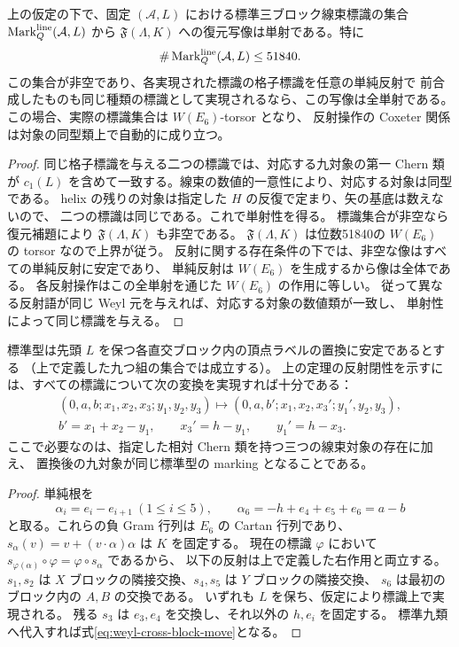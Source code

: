 \begin{theorem}[固定弱標識上の有限性と反射への還元]\label{thm:weyl-frame-injection}
上の仮定の下で、固定 $(\mathcal A,L)$ における標準三ブロック線束標識の集合
$\operatorname{Mark}_Q^{\rm line}(\mathcal A,L)$ から
$\mathfrak F(\Lambda,K)$ への復元写像は単射である。特に
\[
 \#\operatorname{Mark}_Q^{\rm line}(\mathcal A,L)\le51840.
\]
この集合が非空であり、各実現された標識の格子標識を任意の単純反射で
前合成したものも同じ種類の標識として実現されるなら、この写像は全単射である。
この場合、実際の標識集合は $W(E_6)$-torsor となり、
反射操作の Coxeter 関係は対象の同型類上で自動的に成り立つ。
\end{theorem}
\begin{proof}
同じ格子標識を与える二つの標識では、対応する九対象の第一 Chern 類が
$c_1(L)$ を含めて一致する。線束の数値的一意性により、対応する対象は同型である。
helix の残りの対象は指定した $H$ の反復で定まり、矢の基底は数えないので、
二つの標識は同じである。これで単射性を得る。
標識集合が非空なら復元補題により $\mathfrak F(\Lambda,K)$ も非空である。
$\mathfrak F(\Lambda,K)$ は位数51840の $W(E_6)$ の torsor なので上界が従う。
反射に関する存在条件の下では、非空な像はすべての単純反射に安定であり、
単純反射は $W(E_6)$ を生成するから像は全体である。
各反射操作はこの全単射を通じた $W(E_6)$ の作用に等しい。
従って異なる反射語が同じ Weyl 元を与えれば、対応する対象の数値類が一致し、
単射性によって同じ標識を与える。
\end{proof}

\begin{corollary}[一種類の三対象変換への還元]\label{cor:weyl-one-move}
標準型は先頭 $L$ を保つ各直交ブロック内の頂点ラベルの置換に安定であるとする
（上で定義した九つ組の集合では成立する）。
上の定理の反射閉性を示すには、すべての標識について次の変換を実現すれば十分である：
\begin{equation}\label{eq:weyl-cross-block-move}
 \begin{gathered}
 (0,a,b;x_1,x_2,x_3;y_1,y_2,y_3)
 \longmapsto(0,a,b';x_1,x_2,x_3';y_1',y_2,y_3),\\
 b'=x_1+x_2-y_1,\qquad x_3'=h-y_1,\qquad y_1'=h-x_3.
 \end{gathered}
\end{equation}
ここで必要なのは、指定した相対 Chern 類を持つ三つの線束対象の存在に加え、
置換後の九対象が同じ標準型の marking となることである。
\end{corollary}
\begin{proof}
単純根を
\[
 \alpha_i=e_i-e_{i+1}\ (1\le i\le5),\qquad
 \alpha_6=-h+e_4+e_5+e_6=a-b
\]
と取る。これらの負 Gram 行列は $E_6$ の Cartan 行列であり、
$s_\alpha(v)=v+(v\cdot\alpha)\alpha$ は $K$ を固定する。
現在の標識 $\varphi$ において
$s_{\varphi(\alpha)}\circ\varphi=\varphi\circ s_\alpha$ であるから、
以下の反射は上で定義した右作用と両立する。
$s_1,s_2$ は $X$ ブロックの隣接交換、$s_4,s_5$ は $Y$ ブロックの隣接交換、
$s_6$ は最初のブロック内の $A,B$ の交換である。
いずれも $L$ を保ち、仮定により標識上で実現される。
残る $s_3$ は $e_3,e_4$ を交換し、それ以外の $h,e_i$ を固定する。
標準九類へ代入すれば式\eqref{eq:weyl-cross-block-move}となる。
\end{proof}

